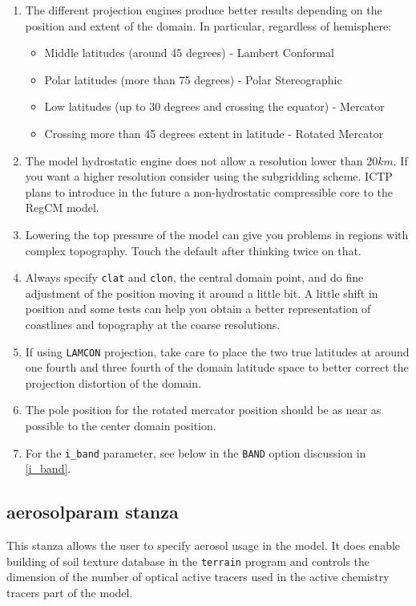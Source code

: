 \begin{enumerate}
\item The different projection engines produce better results depending on the
position and extent of the domain. In particular, regardless of hemisphere:
\begin{itemize}
\item Middle latitudes (around 45 degrees) - Lambert Conformal
\item Polar latitudes (more than 75 degrees) - Polar Stereographic
\item Low latitudes (up to 30 degrees and crossing the equator) - Mercator
\item Crossing more than 45 degrees extent in latitude - Rotated Mercator
\end{itemize}
\item The model hydrostatic engine does not allow a resolution lower than
$20 km$. If you want a higher resolution consider using the subgridding scheme.
ICTP plans to introduce in the future a non-hydrostatic compressible core to
the RegCM model.
\item Lowering the top pressure of the model can give you problems in regions
with complex topography. Touch the default after thinking twice on that.
\item Always specify \verb=clat= and \verb=clon=, the central domain point,
and do fine adjustment of the position moving it around a little bit. A
little shift in position and some tests can help you obtain a better
representation of coastlines and topography at the coarse resolutions.
\item If using \verb=LAMCON= projection, take care to place the two
true latitudes at around one fourth and three fourth of the domain latitude
space to better correct the projection distortion of the domain.
\item The pole position for the rotated mercator position should be as near as
possible to the center domain position.
\item For the \verb=i_band= parameter, see below in the \verb=BAND= option
discussion in \ref{i_band}.
\end{enumerate}

\subsection{aerosolparam stanza}
\label{aerosolparam}
This stanza allows the user to specify aerosol usage in the model. It does
enable building of soil texture database in the \verb=terrain= program and
controls the dimension of the number of optical active tracers used in the
active chemistry tracers part of the model.

